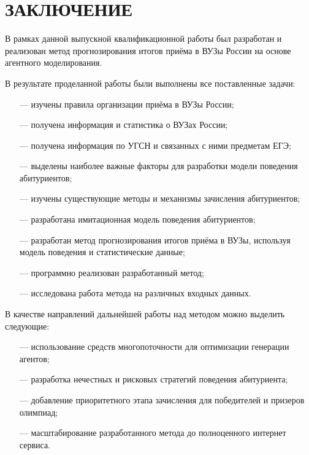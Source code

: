 \section*{ЗАКЛЮЧЕНИЕ}

В рамках данной выпускной квалификационной работы был разработан и
реализован  метод прогнозирования итогов приёма в ВУЗы России на основе агентного моделирования.

В результате проделанной работы были выполнены все поставленные задачи:

\begin{itemize}[leftmargin=1.6\parindent]
	\item[---] изучены правила организации приёма в ВУЗы России;
	\item[---] получена информация и статистика о ВУЗах России;
	\item[---] получена информация по УГСН и связанных с ними предметам ЕГЭ;
	\item[---] выделены наиболее важные факторы для разработки модели поведения абитуриентов;
	\item[---] изучены существующие методы и механизмы зачисления абитуриентов;
	\item[---] разработана имитационная модель поведения абитуриентов;
	\item[---] разработан метод прогнозирования итогов приёма в ВУЗы, используя модель поведения и статистические данные;
	\item[---] программно реализован разработанный метод;
	\item[---] исследована работа метода на различных входных данных.
\end{itemize}


В качестве направлений дальнейшей работы над методом можно выделить следующие:

\begin{itemize}[leftmargin=1.6\parindent]
	\item[---] использование средств многопоточности для оптимизации генерации агентов;
	\item[---] разработка нечестных и рисковых стратегий поведения абитуриента;
	\item[---] добавление приоритетного этапа зачисления для победителей и призеров олимпиад;
	\item[---] масштабирование разработанного метода до полноценного интернет сервиса.
\end{itemize}

\pagebreak